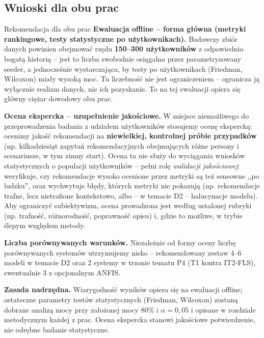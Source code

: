\documentclass[12pt,a4paper]{article}
\begin{document}
\subsection*{Wnioski dla obu prac}

\begin{okbox}{Rekomendacja dla obu prac}
\textbf{Ewaluacja offline -- forma główna (metryki rankingowe, testy statystyczne po użytkownikach).} Badawczy zbiór danych powinien obejmować rzędu \textbf{150--300 użytkowników} z odpowiednio bogatą historią -- jest to liczba swobodnie osiągalna przez parametryzowany seeder, a jednocześnie wystarczająca, by testy po użytkownikach (Friedman, Wilcoxon) miały wysoką moc. Tu liczebność nie jest ograniczeniem -- ogranicza ją wyłącznie realizm danych, nie ich pozyskanie. To na tej ewaluacji opiera się główny ciężar dowodowy obu prac.

\textbf{Ocena ekspercka -- uzupełnienie jakościowe.} W miejsce niemożliwego do przeprowadzenia badania z udziałem użytkowników stosujemy ocenę ekspercką: ocenimy jakość rekomendacji na \textbf{niewielkiej, kontrolnej próbie przypadków} (np. kilkadziesiąt zapytań rekomendacyjnych obejmujących różne persony i scenariusze, w tym zimny start). Ocena ta nie służy do wyciągania wniosków statystycznych o populacji użytkowników -- pełni rolę \emph{walidacji jakościowej}: weryfikuje, czy rekomendacje wysoko ocenione przez metryki są też sensowne ,,po ludzku'', oraz wychwytuje błędy, których metryki nie pokazują (np. rekomendacje trafne, lecz nietrafione kontekstowo, albo -- w temacie D2 -- halucynacje modelu). Aby ograniczyć subiektywizm, ocena prowadzona jest według ustalonej rubryki (np. trafność, różnorodność, poprawność opisu) i, gdzie to możliwe, w trybie ślepym względem metody.

\textbf{Liczba porównywanych warunków.} Niezależnie od formy oceny liczbę porównywanych systemów utrzymujemy nisko -- rekomendowany zestaw 4--6 modeli w temacie D2 oraz 2 systemy w trzonie tematu P4 (T1 kontra IT2-FLS), ewentualnie 3 z opcjonalnym ANFIS.

\textbf{Zasada nadrzędna.} Wiarygodność wyników opiera się na ewaluacji offline; ostateczne parametry testów statystycznych (Friedman, Wilcoxon) zostaną dobrane analizą mocy przy założonej mocy 80\% i $\alpha = 0{,}05$ i opisane w rozdziale metodycznym każdej z prac. Ocena ekspercka stanowi jakościowe potwierdzenie, nie odrębne badanie statystyczne.
\end{okbox}

\end{document}
